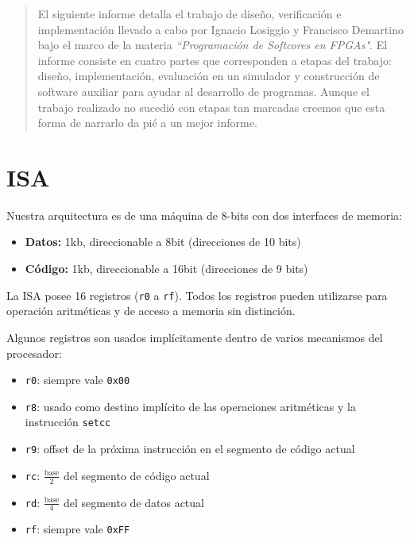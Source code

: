 \documentclass{article}
\begin{document}

\fecha{\today}



\maketitle

\begin{abstract}
El siguiente informe detalla el trabajo de diseño, verificación e implementación llevado a cabo por Ignacio Losiggio y Francisco Demartino bajo el marco de la materia \emph{``Programación de Softcores en FPGAs"}. El informe consiste en cuatro partes que corresponden a etapas del trabajo: diseño, implementación, evaluación en un simulador y construcción de software auxiliar para ayudar al desarrollo de programas. Aunque el trabajo realizado no sucedió con etapas tan marcadas creemos que esta forma de narrarlo da pié a un mejor informe.
\end{abstract}

\tableofcontents

\newpage

\section{ISA}

Nuestra arquitectura es de una máquina de 8-bits con dos interfaces de memoria:
\begin{itemize}
    \item \textbf{Datos:}  1kb, direccionable a 8bit (direcciones de 10 bits)
    \item \textbf{Código:} 1kb, direccionable a 16bit (direcciones de 9 bits)
\end{itemize}

La ISA posee 16 registros (\texttt{r0} a \texttt{rf}). Todos los registros pueden utilizarse para operación aritméticas y de acceso a memoria sin distinción.

Algunos registros son usados implícitamente dentro de varios mecanismos del procesador:
\begin{itemize}
    \item \texttt{r0}: siempre vale \texttt{0x00}
    \item \texttt{r8}: usado como destino implícito de las operaciones aritméticas y la instrucción \texttt{setcc}
    \item \texttt{r9}: offset de la próxima instrucción en el segmento de código actual
    \item \texttt{rc}: $\frac{\text{base}}{2}$ del segmento de código actual
    \item \texttt{rd}: $\frac{\text{base}}{4}$ del segmento de datos actual
    \item \texttt{rf}: siempre vale \texttt{0xFF}
\end{itemize}
\end{document}
